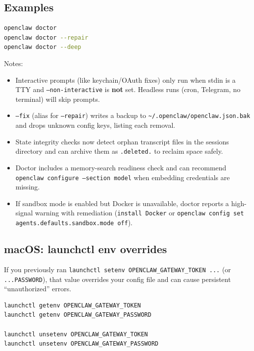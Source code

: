 \subsection{Examples}


\begin{lstlisting}[language=bash]
openclaw doctor
openclaw doctor --repair
openclaw doctor --deep
\end{lstlisting}


Notes:

\begin{itemize}
  \item Interactive prompts (like keychain/OAuth fixes) only run when stdin is a TTY and \texttt{--non-interactive} is \textbf{not} set. Headless runs (cron, Telegram, no terminal) will skip prompts.
  \item \texttt{--fix} (alias for \texttt{--repair}) writes a backup to \texttt{\textasciitilde{}/.openclaw/openclaw.json.bak} and drops unknown config keys, listing each removal.
  \item State integrity checks now detect orphan transcript files in the sessions directory and can archive them as \texttt{.deleted.} to reclaim space safely.
  \item Doctor includes a memory-search readiness check and can recommend \texttt{openclaw configure --section model} when embedding credentials are missing.
  \item If sandbox mode is enabled but Docker is unavailable, doctor reports a high-signal warning with remediation (\texttt{install Docker} or \texttt{openclaw config set agents.defaults.sandbox.mode off}).
\end{itemize}


\subsection{macOS: launchctl env overrides}


If you previously ran \texttt{launchctl setenv OPENCLAW\_GATEWAY\_TOKEN ...} (or \texttt{...PASSWORD}), that value overrides your config file and can cause persistent “unauthorized” errors.

\begin{lstlisting}[language=bash]
launchctl getenv OPENCLAW_GATEWAY_TOKEN
launchctl getenv OPENCLAW_GATEWAY_PASSWORD

launchctl unsetenv OPENCLAW_GATEWAY_TOKEN
launchctl unsetenv OPENCLAW_GATEWAY_PASSWORD
\end{lstlisting}




